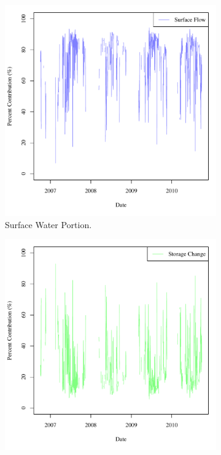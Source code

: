 \begin{linenumbers}
\begin{figure}[htbp]
\centering
	\begin{subfigure}{0.5\textwidth}
		\centering
		\includegraphics[width=0.9\linewidth]{"Figures/Results_USR/M Mass Contrib 1"}
		\caption{Surface Water Portion.}
		\label{sub:USRMSurf}
	\end{subfigure}%
	\begin{subfigure}{0.5\textwidth}
		\centering
		\includegraphics[width=0.9\linewidth]{"Figures/Results_USR/M Mass Contrib 2"}

\end{subfigure}
\end{figure}
\end{linenumbers}
